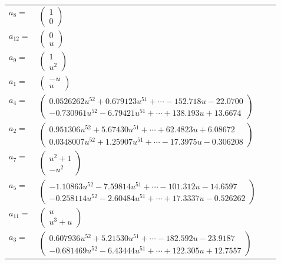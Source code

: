 \documentclass[1p]{elsarticle_modified}
\theoremstyle{definition}
\begin{document}
\begin{tabular}{m{7pt} m{180pt} m{7pt} m{180pt} }
\flushright $a_{8}=$&$\begin{pmatrix}1\\0\end{pmatrix}$ \\
\flushright $a_{12}=$&$\begin{pmatrix}0\\u\end{pmatrix}$ \\
\flushright $a_{9}=$&$\begin{pmatrix}1\\u^2\end{pmatrix}$ \\
\flushright $a_{1}=$&$\begin{pmatrix}- u\\u\end{pmatrix}$ \\
\flushright $a_{4}=$&$\begin{pmatrix}0.0526262 u^{52}+0.679123 u^{51}+\cdots-152.718 u-22.0700\\-0.730961 u^{52}-6.79421 u^{51}+\cdots+138.193 u+13.6674\end{pmatrix}$ \\
\flushright $a_{2}=$&$\begin{pmatrix}0.951306 u^{52}+5.67430 u^{51}+\cdots+62.4823 u+6.08672\\0.0348007 u^{52}+1.25907 u^{51}+\cdots-17.3975 u-0.306208\end{pmatrix}$ \\
\flushright $a_{7}=$&$\begin{pmatrix}u^2+1\\- u^2\end{pmatrix}$ \\
\flushright $a_{5}=$&$\begin{pmatrix}-1.10863 u^{52}-7.59814 u^{51}+\cdots-101.312 u-14.6597\\-0.258114 u^{52}-2.60484 u^{51}+\cdots+17.3337 u-0.526262\end{pmatrix}$ \\
\flushright $a_{11}=$&$\begin{pmatrix}u\\u^3+u\end{pmatrix}$ \\
\flushright $a_{3}=$&$\begin{pmatrix}0.607936 u^{52}+5.21530 u^{51}+\cdots-182.592 u-23.9187\\-0.681469 u^{52}-6.43444 u^{51}+\cdots+122.305 u+12.7557\end{pmatrix}$ \\

\end{tabular}
\end{document}
